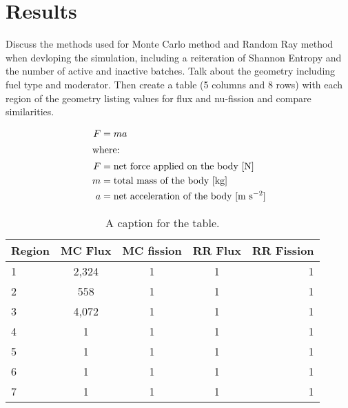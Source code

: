 \pagebreak
\section{Results}
\label{sec:results}

Discuss the methods used for Monte Carlo method and Random Ray method when devloping the simulation, including a reiteration of Shannon Entropy and the number of active and inactive batches. Talk about the geometry including fuel type and moderator. Then create a table (5 columns and 8 rows) with each region of the geometry listing values for flux and nu-fission and compare similarities.

\begin{align}
	F &= ma \\
	\intertext{where:}
	F &= \text{net force applied on the body [N]} \nonumber \\
	m &= \text{total mass of the body [kg]} \nonumber \\
	a &= \text{net acceleration of the body [m s$^{-2}$]} \nonumber
\end{align}

\begin{table}[h]
	\centering
        \caption{A caption for the table.}
\begin{tabular}{lcccr}
	\hline
	\textbf{Region} & \textbf{MC Flux} & \textbf{MC fission} & \textbf{RR Flux} & \textbf{RR Fission} \\
	\hline
	1 & 2,324 & 1 & 1 & 1 \\
	2 & 558 & 1 & 1 & 1 \\
	3 & 4,072 & 1 & 1 & 1 \\
	4 & 1 & 1 & 1 & 1 \\
	5 & 1 & 1 & 1 & 1 \\
	6 & 1 & 1 & 1 & 1 \\
	7 & 1 & 1 & 1 & 1 \\
    \hline
\end{tabular}
\label{tab:table1}
\end {table}
